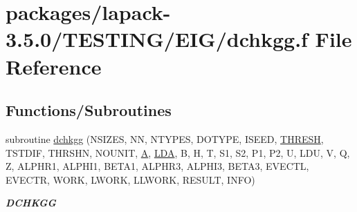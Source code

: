 \hypertarget{dchkgg_8f}{}\section{packages/lapack-\/3.5.0/\+T\+E\+S\+T\+I\+N\+G/\+E\+I\+G/dchkgg.f File Reference}
\label{dchkgg_8f}
\subsection*{Functions/\+Subroutines}
\begin{DoxyCompactItemize}
\item 
subroutine \hyperlink{group__double__eig_ga90e3a487742ba9acb39f783362b5b300}{dchkgg} (N\+S\+I\+Z\+E\+S, N\+N, N\+T\+Y\+P\+E\+S, D\+O\+T\+Y\+P\+E, I\+S\+E\+E\+D, \hyperlink{zlaqgs_8c_a0656018abfc9fa2821827415f5d5ea57}{T\+H\+R\+E\+S\+H}, T\+S\+T\+D\+I\+F, T\+H\+R\+S\+H\+N, N\+O\+U\+N\+I\+T, \hyperlink{classA}{A}, \hyperlink{example__user_8c_ae946da542ce0db94dced19b2ecefd1aa}{L\+D\+A}, B, H, T, S1, S2, P1, P2, U, L\+D\+U, V, Q, Z, A\+L\+P\+H\+R1, A\+L\+P\+H\+I1, B\+E\+T\+A1, A\+L\+P\+H\+R3, A\+L\+P\+H\+I3, B\+E\+T\+A3, E\+V\+E\+C\+T\+L, E\+V\+E\+C\+T\+R, W\+O\+R\+K, L\+W\+O\+R\+K, L\+L\+W\+O\+R\+K, R\+E\+S\+U\+L\+T, I\+N\+F\+O)
\begin{DoxyCompactList}\small\item\em {\bfseries D\+C\+H\+K\+G\+G} \end{DoxyCompactList}\end{DoxyCompactItemize}
